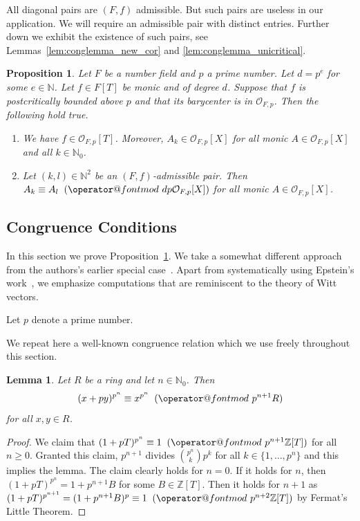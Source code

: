 \documentclass[12pt,oneside,a4]{amsart}
\makeatletter
\newcommand{\IN}{\mathbb{N}}
\newcommand{\IZ}{\mathbb{Z}}
\newcommand{\cO}{\mathcal{O}}
\newcounter{maincounter}
\numberwithin{maincounter}{section}
\numberwithin{equation}{section}
\newtheorem{lemma}[maincounter]{Lemma}
\newtheorem{propo}[maincounter]{Proposition}
\def\imod#1{\allowbreak\mkern10mu({\operator@font mod}\,\,#1)}
\makeatother
\begin{document}
All diagonal pairs are $(F,f)$ admissible.
But such pairs are useless in our application.
We will require an admissible pair with distinct entries. Further
down we exhibit the existence of such pairs, see
Lemmas~\ref{lem:conglemma_new_cor} and \ref{lem:conglemma_unicritical}.


\begin{propo}
  \label{prop:congruence}
  Let $F$ be a number field and $p$ a prime number. Let $d=p^e$ for
  some $e\in\IN$. Let $f\in F[T]$ be monic and of degree $d$. Suppose
  that $f$ is postcritically bounded above $p$ and that its barycenter
  is in $\cO_{F,p}$. Then the following hold true.
  \begin{enumerate}
  \item [(i)] We have $f\in \cO_{F,p}[T]$. Moreover,
    $A_k\in \cO_{F,p}[X]$ for all monic $A\in \cO_{F,p}[X]$ and
    all $k\in\IN_0$.
  \item[(ii)] Let $(k,l)\in\IN^2$ be an $(F,f)$-admissible pair. Then
    $A_k\equiv A_l \imod{dp \cO_{F,p}[X]}$
    for all monic $A\in \cO_{F,p}[X]$.  
  \end{enumerate}  
\end{propo}


\subsection{Congruence Conditions}

In this section we prove Proposition~\ref{prop:congruence}. We take a
somewhat different approach from the authors's earlier special
case~\cite{hs:2021lower}. Apart from systematically using Epstein's
work~\cite{epstein:12}, we emphasize computations that are reminiscent
to the theory of Witt vectors.

Let $p$ denote a prime number.

We repeat here a well-known congruence relation which we use freely
throughout this section.
\begin{lemma}
  \label{lem:congruencedp}
  Let $R$ be a ring and let $n\in\IN_0$. Then
  \begin{equation*}
    (x+py)^{p^{n}} \equiv x^{p^{n}} \imod {p^{n+1} R}
  \end{equation*}
  for all $x,y\in R$. 
\end{lemma}
\begin{proof}
  We claim that $(1+p T)^{p^n} \equiv 1 \imod{p^{n+1}\IZ[T]}$ for all $n\ge
  0$. Granted this claim,  $p^{n+1}$
  divides ${p^n\choose k} p^k$ for all $k\in \{1,\ldots,p^n\}$ and this
  implies the lemma. The claim clearly holds for $n=0$.
  If it holds for $n$, then $(1+pT)^{p^n} = 1+ p^{n+1} B$ for some
  $B\in\IZ[T]$. Then it holds for $n+1$ as
  $(1+pT)^{p^{n+1}}  = (1+p^{n+1}B)^p \equiv 1
  \imod{p^{n+2}\IZ[T]}$ by Fermat's Little Theorem. 
\end{proof}
\end{document}
